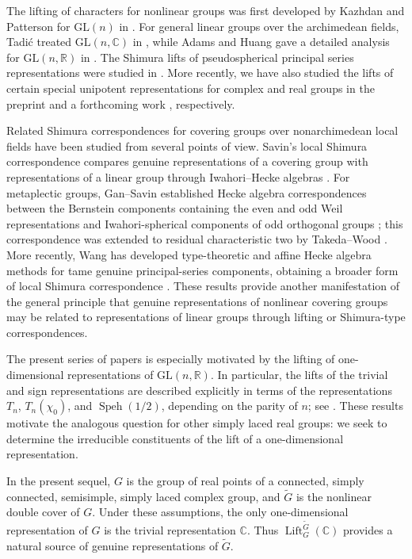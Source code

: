 \documentclass{amsart}
\DeclareMathOperator{\Lift}{Lift}
\newcommand{\bbC}{{\mathbb{C}}}
\newcommand{\bbR}{{\mathbb R}}
\newcommand{\GL}{{\mathrm{GL}}}
\theoremstyle{definition}
\newcommand{\tu}{\widetilde}
\begin{document}
The lifting of characters for nonlinear groups was first developed by
Kazhdan and Patterson for \(\GL(n)\) in \cite{KP84,KP86}.  For general
linear groups over the archimedean fields, Tadi\'c treated
\(\GL(n,\bbC)\) in \cite{T96}, while Adams and Huang gave a detailed analysis for
\(\GL(n,\bbR)\) in \cite{AHu97}.  The Shimura lifts of pseudospherical
principal series representations were studied in \cite{ABPTV07}.
More recently, we have also studied the lifts of certain special
unipotent representations for complex and real groups in the preprint
\cite{TWZ} and a forthcoming work \cite{TsW}, respectively.
\medskip

Related Shimura correspondences for covering groups over nonarchimedean
local fields have been studied from several points of view.  Savin's
local Shimura correspondence compares genuine representations of a
covering group with representations of a linear group through
Iwahori--Hecke algebras \cite{Sa88}.  For metaplectic groups, Gan--Savin
established Hecke algebra correspondences between the Bernstein
components containing the even and odd Weil representations and
Iwahori-spherical components of odd orthogonal groups
\cite{GS12}; this correspondence was extended to residual
characteristic two by Takeda--Wood \cite{TW18}.  More recently, Wang
has developed type-theoretic and affine Hecke algebra methods for tame
genuine principal-series components, obtaining a broader form of local
Shimura correspondence \cite{WangShimura}.  These results provide
another manifestation of the general principle that genuine
representations of nonlinear covering groups may be related to
representations of linear groups through lifting or Shimura-type
correspondences.
\medskip


The present series of papers is especially motivated by the lifting of
one-dimensional representations of $\GL(n,\bbR)$.  In particular,
the lifts of the trivial and sign representations are described
explicitly in terms of the representations $T_n$, $T_n(\chi_0)$,
and $\operatorname{Speh}(1/2)$, depending on the parity of $n$;
see \cite{H90,AHu97}.  These results motivate the analogous question
for other simply laced real groups: we seek to determine the
irreducible constituents of the lift of a one-dimensional
representation.
\medskip

In the present sequel, $G$ is the group of real points of a connected,
simply connected, semisimple, simply laced complex group, and $\tu G$
is the nonlinear double cover of $G$.  Under these assumptions, the
only one-dimensional representation of $G$ is the trivial
representation $\bbC$.  Thus
$\Lift_G^{\tu G}(\bbC)$
provides a natural source of genuine representations of $\tu G$.
\end{document}
